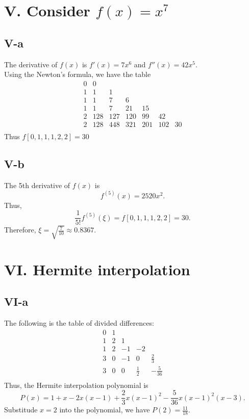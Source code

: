 \documentclass[a4paper]{article}
\begin{document}
\section*{V. Consider $f(x) = x^7$}
\subsection*{V-a}
The derivative of $f(x)$ is $f'(x) = 7x^6$ and $f''(x) = 42x^5$.\\
Using the Newton's formula, we have the table
\[
\begin{array}{c|cccccc}
    0 & 0 &  &  & && \\
    1 & 1 & 1 &  & && \\
    1 & 1 & 7 & 6 &  &&\\
    1 & 1 & 7 & 21 & 15&& \\
    2 & 128 & 127 & 120 & 99 &42&\\
    2 & 128 & 448 & 321 & 201 &102&30\\
\end{array}
\]
Thus $f[0,1,1,1,2,2] = 30$

\subsection*{V-b}
The 5th derivative of $f(x)$ is \[f^{(5)}(x) = 2520x^2.\]
Thus,\[
\frac{1}{5!}f^{(5)}(\xi) = f[0,1,1,1,2,2] = 30.
\]
Therefore, $\xi = \sqrt{\frac{7}{10}} \approx 0.8367$.

\section*{VI. Hermite interpolation}
\subsection*{VI-a}
The following is the table of divided differences:
\[
\begin{array}{c|cccc}
    0 & 1 &  &  &  \\
    1 & 2 & 1 &  &  \\
    1 & 2 & -1 & -2 &  \\
    3 & 0 & -1 & 0 & \frac{2}{3} \\
    3 & 0 & 0 & \frac{1}{2}  & -\frac{5}{36} \\    
\end{array}\]
Thus, the Hermite interpolation polynomial is
\[P(x) = 1 + x - 2x(x-1) + \frac{2}{3}x(x-1)^2 - \frac{5}{36}x(x-1)^2(x-3).\]
Substitude $x = 2$ into the polynomial, we have $P(2) = \frac{11}{18}$.
\end{document}
